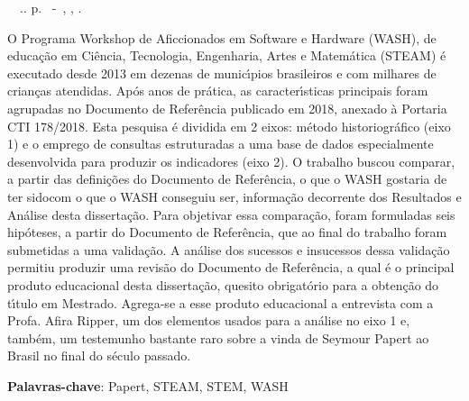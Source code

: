 \setlength{\absparsep}{18pt} %
\begin{resumo}
\begin{flushleft} 
\setlength{\absparsep}{0pt} %
\SingleSpacing 
\imprimirautorabr~~\textbf{\imprimirtituloresumo}.\imprimirdata. \pageref{LastPage}p. 
\imprimirtipotrabalho~-~\imprimirinstituicao, \imprimirlocal, \imprimirdata. 
 \end{flushleft}
\OnehalfSpacing 
O  Programa Workshop de Aficcionados em Software e Hardware (WASH), de educa\c{c}\~ao em Ci\^encia, Tecnologia, Engenharia, Artes e Matem\'atica (STEAM) \'e executado desde 2013 em dezenas de munic\'{\i}pios brasileiros e com milhares de crian\c{c}as atendidas. Ap\'os anos de pr\'atica, as caracter\'{\i}sticas principais foram agrupadas no Documento de Refer\^encia publicado em 2018, anexado \`a Portaria CTI 178/2018. Esta pesquisa \'e dividida em 2 eixos: m\'etodo historiogr\'afico (eixo 1) e o emprego de consultas estruturadas a uma base de dados especialmente desenvolvida para produzir os indicadores (eixo 2). O trabalho buscou comparar, a partir das defini\c{c}\~oes do Documento de Refer\^encia, \textquotedbl o que o WASH gostaria de ter sido\textquotedbl  com \textquotedbl o que o WASH conseguiu ser\textquotedbl , informa\c{c}\~ao decorrente dos Resultados e An\'alise desta disserta\c{c}\~ao. Para objetivar essa compara\c{c}\~ao, foram formuladas seis hip\'oteses, a partir do Documento de Refer\^encia, que ao final do trabalho foram submetidas a uma valida\c{c}\~ao.  A an\'alise dos sucessos e insucessos dessa valida\c{c}\~ao permitiu produzir uma revis\~ao do Documento de Refer\^encia, a qual \'e o principal produto educacional desta disserta\c{c}\~ao, quesito obrigat\'orio para a obten\c{c}\~ao do t\'{\i}tulo em Mestrado. Agrega-se a esse produto educacional a entrevista com a Profa. Afira Ripper, um dos elementos usados para a an\'alise no eixo 1 e, tamb\'em, um testemunho bastante raro sobre a vinda de Seymour Papert ao Brasil no final do s\'eculo passado.
 

 \textbf{Palavras-chave}: Papert, STEAM, STEM, WASH
\end{resumo}